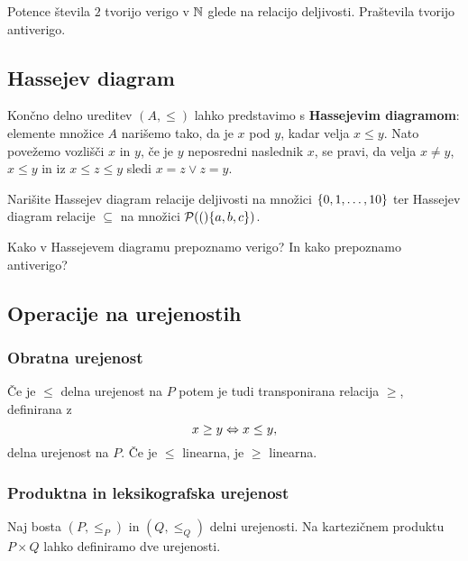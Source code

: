 \begin{primer}
  Potence števila $2$ tvorijo verigo v $\mathbb{N}$ glede na relacijo deljivosti.
  Praštevila tvorijo antiverigo.
\end{primer}


\subsection{Hassejev diagram}

Končno delno ureditev $(A, \leq)$ lahko predstavimo s \textbf{Hassejevim diagramom}: elemente
množice $A$ narišemo tako, da je $x$ pod $y$, kadar velja $x \leq y$. Nato povežemo vozlišči $x$ in $y$, če je $y$ neposredni naslednik $x$, se pravi, da velja $x \neq y$, $x \leq y$ in iz $x \leq z \leq y$ sledi $x = z \lor z = y$.

\begin{naloga}
  Narišite Hassejev diagram relacije deljivosti na množici $\left\{0, 1, \dots, 10\right\}$ ter
  Hassejev diagram relacije $\subseteq$ na množici $\mathcal{P}(()\{a,b,c\})$.
\end{naloga}

\begin{naloga}
  Kako v Hassejevem diagramu prepoznamo verigo? In kako prepoznamo antiverigo?
\end{naloga}


\subsection{Operacije na urejenostih}

\subsubsection{Obratna urejenost}

Če je $\leq$ delna urejenost na $P$ potem je tudi transponirana relacija $\geq$, definirana z
%
\begin{equation*}
    x \geq y \Leftrightarrow x \leq y,
\end{equation*}
%
delna urejenost na $P$. Če je $\leq$ linearna, je $\geq$ linearna.

\subsubsection{Produktna in leksikografska urejenost}

Naj bosta $(P, {\leq_P})$ in $(Q, {\leq_Q})$ delni urejenosti. Na kartezičnem produktu $P \times Q$ lahko definiramo dve urejenosti.

